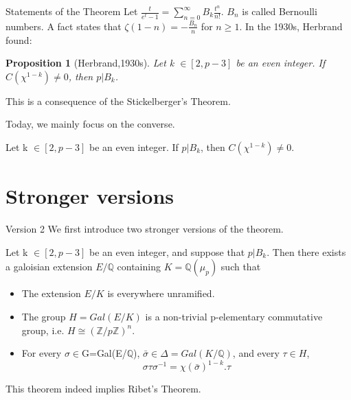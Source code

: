\documentclass{beamer}
\theoremstyle{plain}
\newtheorem{proposition}{Proposition}[section]
\theoremstyle{definition}
\theoremstyle{remark}
\newcommand{\Q}{\mathbb{Q}}
\newcommand{\Z}{\mathbb{Z}}
\begin{document}
\begin{frame}{Statements of the Theorem}
    Let $\frac{t}{e^t-1}=\sum_{n=0}^{\infty}B_k\frac{t^n}{n!}$. $B_n$ is called Bernoulli numbers.
    A fact states that $\zeta(1-n)=-\frac{B_n}{n}$ for $n \ge 1$.\pause
    \vskip 0.2cm
    In the 1930s, Herbrand found:
    \begin{proposition}[Herbrand,1930s]
        Let k $\in [2,p-3] $ be an even integer. If $C(\chi^{1-k}) \ne 0$, then $p |B_k$.
    \end{proposition}
    This is a consequence of the Stickelberger's Theorem.

    Today, we mainly focus on the converse.
    \begin{theorem}[Ribet,1970s]
        Let k $\in [2,p-3] $ be an even integer. If $p|B_k$, then $C(\chi^{1-k}) \ne 0.$
    \end{theorem}
\end{frame}

\section{Stronger versions}
\begin{frame}{Version 2}
    We first introduce two stronger versions of the theorem.
    \begin{theorem}
        Let k $\in [2,p-3] $ be an even integer, and suppose that $p|B_k$.
        Then there exists a galoisian extension $E/\Q$ containing $K=\Q(\mu_p)$ such that
        \begin{itemize}
            \item The extension $E/K$ is everywhere unramified.
            \item The group $H=Gal(E/K)$ is a non-trivial p-elementary commutative group, i.e. $H \cong (\Z/p\Z)^n$.
            \item For every $\sigma \in $G=Gal(E/$\Q$), $\bar{\sigma} \in \Delta=Gal(K/\Q)$, and every $\tau \in H$,
                  \[\sigma \tau \sigma^{-1}= \chi(\bar{\sigma})^{1-k}. \tau \]
        \end{itemize}
    \end{theorem}
    This theorem indeed implies Ribet's Theorem.
\end{frame}
\end{document}
